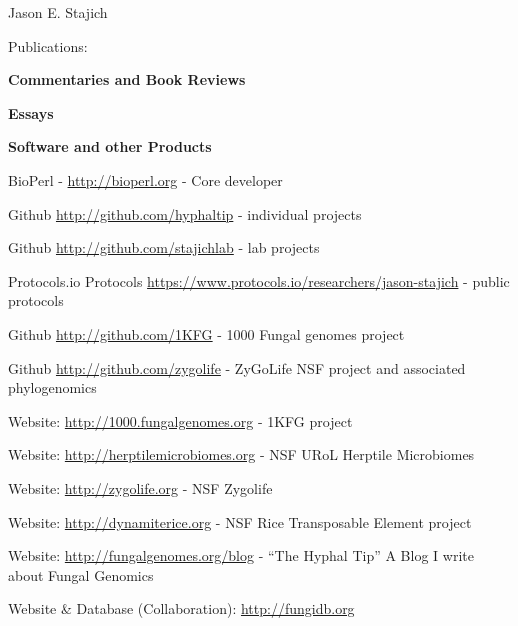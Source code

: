 \documentclass[10pt]{article}
\begin{document}
\begin{cv}{\centerline{Jason E. Stajich}}
\begin{cvlist}{Publications:}

\item \textbf{Commentaries and Book Reviews}


\item \textbf{Essays}

\begin{cvlistcompact}{\bf Software and other Products}
  \item BioPerl - \url{http://bioperl.org} - Core developer
\item Github \url{http://github.com/hyphaltip} - individual
  projects
\item Github \url{http://github.com/stajichlab} - lab
  projects
 \item Protocols.io Protocols \url{https://www.protocols.io/researchers/jason-stajich} - public protocols
 \item Github \url{http://github.com/1KFG} - 1000 Fungal
   genomes project
\item Github \url{http://github.com/zygolife} - ZyGoLife NSF project
  and associated phylogenomics
\item Website: \url{http://1000.fungalgenomes.org} - 1KFG project
\item Website: \url{http://herptilemicrobiomes.org} - NSF URoL Herptile Microbiomes
\item Website: \url{http://zygolife.org} - NSF Zygolife
\item Website: \url{http://dynamiterice.org} - NSF Rice Transposable
    Element project
\item Website: \url{http://fungalgenomes.org/blog} - ``The Hyphal
  Tip'' A Blog I write about Fungal Genomics
\item Website \& Database (Collaboration): \url{http://fungidb.org}
\end{cvlistcompact}


\end{cvlist}
\setlength{\cvlabelwidth}{24mm}



\end{cv}
\end{document}
